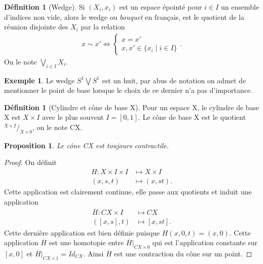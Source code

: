 \documentclass[12pt]{book}
\newtheorem{prop}[lemma]{Proposition}
\theoremstyle{definition}
\newtheorem{definition}[lemma]{Définition}
\newtheorem{example}[lemma]{Exemple}
\theoremstyle{remark}
\newcommand*\quot[2]{{^{\textstyle #1}\big/_{\textstyle #2}}}
\begin{document}
	\begin{definition}[Wedge]
		Si $(X_i,x_i)$ est un espace épointé pour $i\in I$ un ensemble d'indices non vide, alors le wedge ou \emph{bouquet} en français, est le quotient de la réunion disjointe des $X_i$ par la relation
		 \begin{align*}
			x\sim x' \iff \begin{cases}
				x=x' \\
				x,x' \in \{x_i \;|\; i\in I\} 
			\end{cases}
		.\end{align*} On le note $\bigvee_{i\in I} X_i$.
	\end{definition}
	\begin{example}
		Le wedge $S^1 \bigvee S^1$ est un huit, par abus de notation on admet de mentionner le point de base lorsque le choix de ce dernier n'a pas d'importance.
	\end{example}

	\begin{definition}[Cylindre et cône de base X]
		Pour un espace X, le cylindre de base X est $X \times I$ avec le plus souvent $I = [0,1]$.
		Le cône de base X est le quotient $\quot{X\times I}{X \times 0}$, on le note CX.
	\end{definition}
	\begin{prop}
		Le cône CX est toujours contractile.	
	\end{prop}
	\begin{proof}
		On définit 
		\begin{align*}
			H : X \times I \times I &\longmapsto X \times I \\
			(x,s,t) &\longmapsto (x,st)
		.\end{align*}
		Cette application est clairement continue, elle passe aux quotients et induit une application
		\begin{align*}
			\overline{H} : CX \times I &\longmapsto CX \\
			([x,s],t) &\longmapsto [x,st]
		.\end{align*}
		Cette dernière application est bien définie puisque $H(x,0,t) = (x,0)$. Cette application  $\overline{H}$ est une homotopie entre $\overline{H} \vert_{CX \times 0}$
		qui est l'application constante sur $[x,0]$ et $\overline{H} \vert _{CX \times 1} = Id_{CX}$.
		Ainsi  $\overline{H}$ est une contraction du cône sur un point.
	\end{proof}
\end{document}
